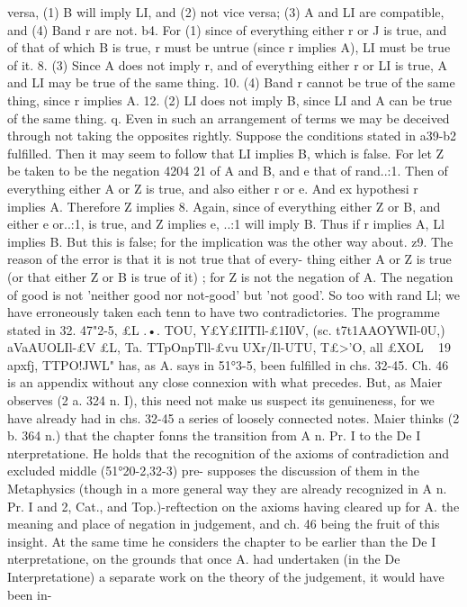 {{{{{{{{{{{{{{{{{{{{{{{{{{{{{{{{{{{{{{versa, (1) B will imply LI, and (2) not vice versa; (3) A and LI are
compatible, and (4) Band r are not.
b4. For (1) since of everything either r or J is true, and of that
of which B is true, r must be untrue (since r implies A), LI must
be true of it.
8. (3) Since A does not imply r, and of everything either r or
LI is true, A and LI may be true of the same thing.
10. (4) Band r cannot be true of the same thing, since r
implies A.
12. (2) LI does not imply B, since LI and A can be true of the
same thing.
q. Even in such an arrangement of terms we may be deceived
through not taking the opposites rightly. Suppose the conditions
stated in a39-b2 fulfilled. Then it may seem to follow that LI
implies B, which is false. For let Z be taken to be the negation
4204 21
of A and B, and e that of rand..:1. Then of everything either
A or Z is true, and also either r or e. And ex hypothesi r implies
A. Therefore Z implies 8. Again, since of everything either Z
or B, and either e or..:1, is true, and Z implies e, ..:1 will imply B.
Thus if r implies A, Ll implies B. But this is false; for the
implication was the other way about.
z9. The reason of the error is that it is not true that of every-
thing either A or Z is true (or that either Z or B is true of it) ; for
Z is not the negation of A. The negation of good is not 'neither
good nor not-good' but 'not good'. So too with rand Ll; we have
erroneously taken each tenn to have two contradictories.
The programme stated in 32. 47"2-5, £L .•. TOU, Y£Y£IIT}Il-£1I0V,
(sc. t7t1AAOYWIl-0U,) aVaAUOLIl-£V £L, Ta. TTpOnpT}ll-£vu UXr/Il-UTU, T£>'O, all £XOL
~ 19 apxfj, TTPO!JWL" has, as A. says in 51°3-5, been fulfilled in chs.
32-45. Ch. 46 is an appendix without any close connexion with
what precedes. But, as Maier observes (2 a. 324 n. I), this need not
make us suspect its genuineness, for we have already had in
chs. 32-45 a series of loosely connected notes. Maier thinks
(2 b. 364 n.) that the chapter fonns the transition from A n. Pr. I
to the De I nterpretatione. He holds that the recognition of the
axioms of contradiction and excluded middle (51°20-2,32-3) pre-
supposes the discussion of them in the Metaphysics (though in
a more general way they are already recognized in A n. Pr. I and 2,
Cat., and Top.)-reftection on the axioms having cleared up for
A. the meaning and place of negation in judgement, and ch. 46
being the fruit of this insight. At the same time he considers the
chapter to be earlier than the De I nterpretatione, on the grounds
that once A. had undertaken (in the De Interpretatione) a separate
work on the theory of the judgement, it would have been in-
}}}}}}}}}}}}}}}}}}}}}}}}}}}}}}}}}}}}
